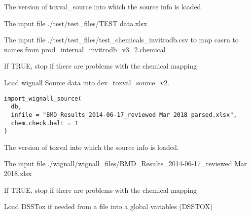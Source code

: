 \documentclass[letterpaper]{book}
\begin{document}
\begin{Arguments}
\begin{ldescription}
\item[\code{db}] The version of toxval\_source into which the source info is loaded.

\item[\code{infile1}] The input file ./test/test\_files/TEST data.xlsx

\item[\code{infile2}] The input file ./test/test\_files/test\_chemicals\_invitrodb.csv to map casrn to names from prod\_internal\_invitrodb\_v3\_2.chemical

\item[\code{chem.check.halt}] If TRUE, stop if there are problems with the chemical mapping
\end{ldescription}
\end{Arguments}
%
\begin{Description}\relax
Load wignall Source data into dev\_toxval\_source\_v2.
\end{Description}
%
\begin{Usage}
\begin{verbatim}
import_wignall_source(
  db,
  infile = "BMD_Results_2014-06-17_reviewed Mar 2018 parsed.xlsx",
  chem.check.halt = T
)
\end{verbatim}
\end{Usage}
%
\begin{Arguments}
\begin{ldescription}
\item[\code{db}] The version of toxval into which the source info is loaded.

\item[\code{infile}] The input file ./wignall/wignall\_files/BMD\_Results\_2014-06-17\_reviewed Mar 2018.xlsx

\item[\code{chem.check.halt}] If TRUE, stop if there are problems with the chemical mapping
\end{ldescription}
\end{Arguments}
%
\begin{Description}\relax
Load DSSTox if needed from a file into a global variables (DSSTOX)
\end{Description}
\end{document}
